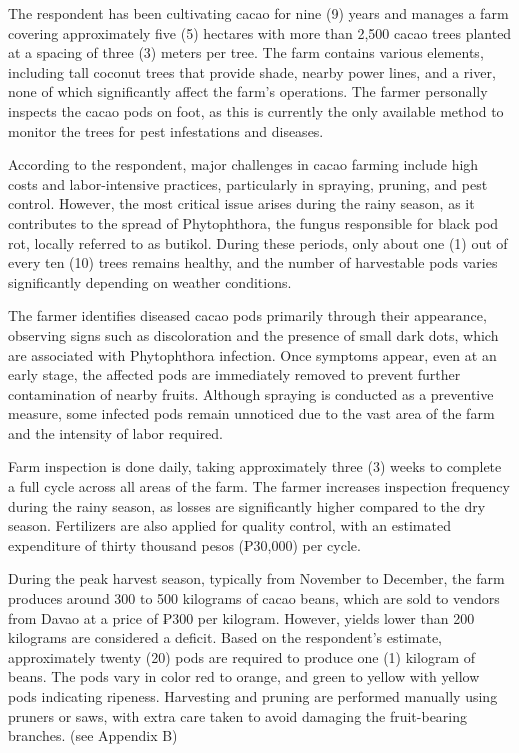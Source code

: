 The respondent has been cultivating cacao for nine (9) years and manages a farm covering approximately five (5) hectares with more than 2,500 cacao trees planted at a spacing of three (3) meters per tree. The farm contains various elements, including tall coconut trees that provide shade, nearby power lines, and a river, none of which significantly affect the farm’s operations. The farmer personally inspects the cacao pods on foot, as this is currently the only available method to monitor the trees for pest infestations and diseases.

According to the respondent, major challenges in cacao farming include high costs and labor-intensive practices, particularly in spraying, pruning, and pest control. However, the most critical issue arises during the rainy season, as it contributes to the spread of Phytophthora, the fungus responsible for black pod rot, locally referred to as butikol. During these periods, only about one (1) out of every ten (10) trees remains healthy, and the number of harvestable pods varies significantly depending on weather conditions.

The farmer identifies diseased cacao pods primarily through their appearance, observing signs such as discoloration and the presence of small dark dots, which are associated with Phytophthora infection. Once symptoms appear, even at an early stage, the affected pods are immediately removed to prevent further contamination of nearby fruits. Although spraying is conducted as a preventive measure, some infected pods remain unnoticed due to the vast area of the farm and the intensity of labor required.

Farm inspection is done daily, taking approximately three (3) weeks to complete a full cycle across all areas of the farm. The farmer increases inspection frequency during the rainy season, as losses are significantly higher compared to the dry season. Fertilizers are also applied for quality control, with an estimated expenditure of thirty thousand pesos (₱30,000) per cycle.

During the peak harvest season, typically from November to December, the farm produces around 300 to 500 kilograms of cacao beans, which are sold to vendors from Davao at a price of ₱300 per kilogram. However, yields lower than 200 kilograms are considered a deficit. Based on the respondent’s estimate, approximately twenty (20) pods are required to produce one (1) kilogram of beans. The pods vary in color red to orange, and green to yellow with yellow pods indicating ripeness. Harvesting and pruning are performed manually using pruners or saws, with extra care taken to avoid damaging the fruit-bearing branches. (see Appendix B)

